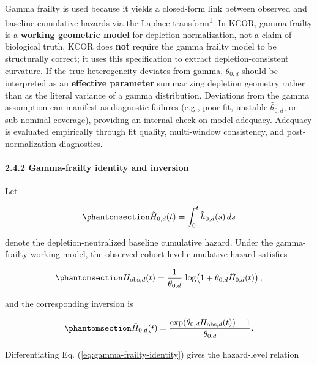 \documentclass[
]{article}
\begin{document}
Gamma frailty is used because it yields a closed-form link between observed and baseline cumulative hazards via the Laplace transform\textsuperscript{1}. In KCOR, gamma frailty is a \textbf{working geometric model} for depletion normalization, not a claim of biological truth. KCOR does \textbf{not} require the gamma frailty model to be structurally correct; it uses this specification to extract depletion-consistent curvature. If the true heterogeneity deviates from gamma, \(\theta_{0,d}\) should be interpreted as an \textbf{effective parameter} summarizing depletion geometry rather than as the literal variance of a gamma distribution. Deviations from the gamma assumption can manifest as diagnostic failures (e.g., poor fit, unstable \(\hat{\theta}_{0,d}\), or sub-nominal coverage), providing an internal check on model adequacy. Adequacy is evaluated empirically through fit quality, multi-window consistency, and post-normalization diagnostics.

\paragraph{2.4.2 Gamma-frailty identity and inversion}\label{gamma-frailty-identity-and-inversion}

Let

\begin{equation}\protect\phantomsection\label{eq:baseline-cumhazard}{\tilde H_{0,d}(t) = \int_0^t \tilde h_{0,d}(s)\,ds}\end{equation}

denote the depletion-neutralized baseline cumulative hazard. Under the gamma-frailty working model, the observed cohort-level cumulative hazard satisfies

\begin{equation}\protect\phantomsection\label{eq:gamma-frailty-identity}{H_{\mathrm{obs},d}(t) = \frac{1}{\theta_{0,d}}\,\log\!\left(1 + \theta_{0,d} \tilde H_{0,d}(t)\right),}\end{equation}

and the corresponding inversion is

\begin{equation}\protect\phantomsection\label{eq:gamma-frailty-inversion}{\tilde H_{0,d}(t) = \frac{\exp\!\left(\theta_{0,d} H_{\mathrm{obs},d}(t)\right) - 1}{\theta_{0,d}}.}\end{equation}

Differentiating Eq. (\ref{eq:gamma-frailty-identity}) gives the hazard-level relation
\end{document}
